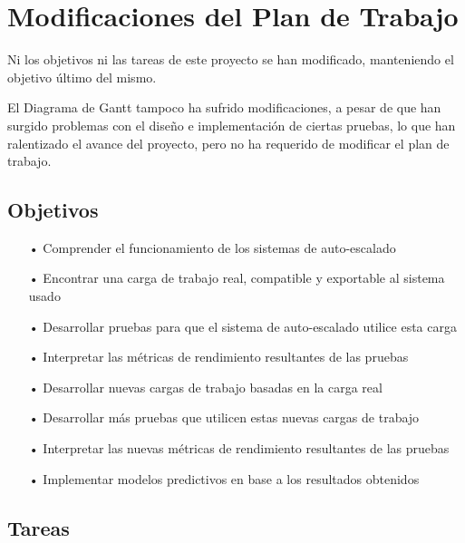 
\chapter*{Modificaciones del Plan de Trabajo}

Ni los objetivos ni las tareas de este proyecto se han modificado, manteniendo el objetivo último del mismo.

El Diagrama de Gantt tampoco ha sufrido modificaciones, a pesar de que han surgido problemas con el diseño
e implementación de ciertas pruebas, lo que han ralentizado el avance del proyecto, pero no ha requerido
de modificar el plan de trabajo.

\section*{Objetivos}

\begin{itemize}
    \item[•] Comprender el funcionamiento de los sistemas de auto-escalado
    \item[•] Encontrar una carga de trabajo real, compatible y exportable al sistema usado
    \item[•] Desarrollar pruebas para que el sistema de auto-escalado utilice esta carga
    \item[•] Interpretar las métricas de rendimiento resultantes de las pruebas
    \item[•] Desarrollar nuevas cargas de trabajo basadas en la carga real
    \item[•] Desarrollar más pruebas que utilicen estas nuevas cargas de trabajo
    \item[•] Interpretar las nuevas métricas de rendimiento resultantes de las pruebas
    \item[•] Implementar modelos predictivos en base a los resultados obtenidos
\end{itemize}


\section*{Tareas}


